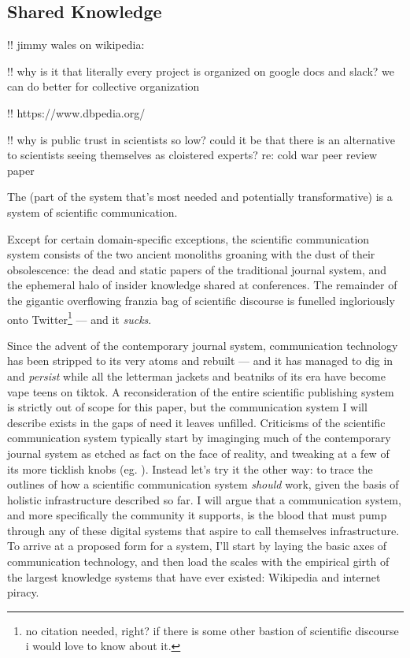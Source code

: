 \documentclass[10pt]{article}
\begin{document}
\hypertarget{shared-knowledge}{%
\subsection{Shared Knowledge}\label{shared-knowledge}}


\begin{multicols}{2}
 !! jimmy wales on wikipedia:

!! why is it that literally every project is organized on google docs
and slack? we can do better for collective organization

!! https://www.dbpedia.org/

!! why is public trust in scientists so low? could it be that there is
an alternative to scientists seeing themselves as cloistered experts?
re: cold war peer review paper

The (part of the system that's most needed and potentially
transformative) is a system of scientific communication.

Except for certain domain-specific exceptions, the scientific
communication system consists of the two ancient monoliths groaning with
the dust of their obsolescence: the dead and static papers of the
traditional journal system, and the ephemeral halo of insider knowledge
shared at conferences. The remainder of the gigantic overflowing franzia
bag of scientific discourse is funelled ingloriously onto
Twitter\footnote{no citation needed, right? if there is some other
  bastion of scientific discourse i would love to know about it.} ---
and it \emph{sucks}.

Since the advent of the contemporary journal system, communication
technology has been stripped to its very atoms and rebuilt --- and it
has managed to dig in and \emph{persist} while all the letterman jackets
and beatniks of its era have become vape teens on tiktok. A
reconsideration of the entire scientific publishing system is strictly
out of scope for this paper, but the communication system I will
describe exists in the gaps of need it leaves unfilled. Criticisms of
the scientific communication system typically start by imaginging much
of the contemporary journal system as etched as fact on the face of
reality, and tweaking at a few of its more ticklish knobs (eg. \cite{heesenPeerReviewGood2020} ). Instead let's try it the other way: to
trace the outlines of how a scientific communication system
\emph{should} work, given the basis of holistic infrastructure described
so far. I will argue that a communication system, and more specifically
the community it supports, is the blood that must pump through any of
these digital systems that aspire to call themselves infrastructure. To
arrive at a proposed form for a system, I'll start by laying the basic
axes of communication technology, and then load the scales with the
empirical girth of the largest knowledge systems that have ever existed:
Wikipedia and internet piracy.


\end{multicols}
\end{document}
